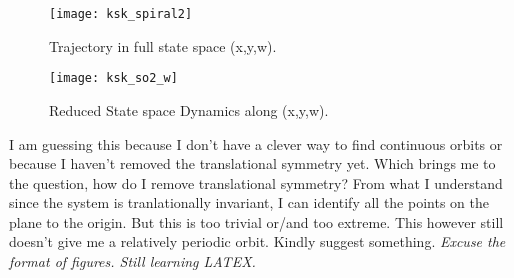 \begin{description}
\begin{figure}[b]
\begin{left}
\texttt{[image: ksk\_spiral2]}
\end{left}
\caption{ Trajectory in full state space (x,y,w).
    }
\label{fig:ksk_spiral2}
\end{figure}

\begin{figure}[ht]
\begin{left}
\texttt{[image: ksk\_so2\_w]}
\end{left}
\caption{ Reduced State space Dynamics along (x,y,w).
    }
\label{fig:ksk_so2_w}
\end{figure}

I am guessing this because I don't have a clever way to find continuous orbits or 
because I haven't removed the translational symmetry yet. Which brings me to the question, how do I remove translational symmetry?
From what I understand since the system is tranlationally invariant, I can identify all the points
on the plane to the origin. But this is too trivial or/and too extreme. This however still doesn't give me a relatively periodic orbit.
Kindly suggest something.
\textit{Excuse the format of figures. Still learning LATEX.}

\end{description}
\renewcommand{\ssp}{a}

